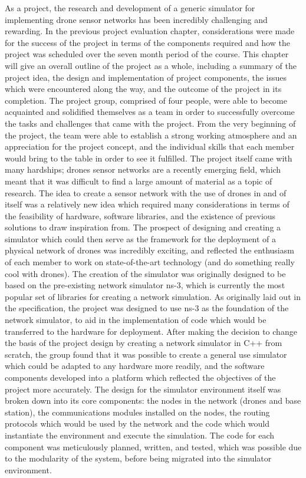 As a project, the research and development of a generic simulator for implementing drone sensor networks has been incredibly challenging and rewarding. In the previous project evaluation chapter, considerations were made for the success of the project in terms of the components required and how the project was scheduled over the seven month period of the course. This chapter will give an overall outline of the project as a whole, including a summary of the project idea, the design and implementation of project components, the issues which were encountered along the way, and the outcome of the project in its completion. 
The project group, comprised of four people, were able to become acquainted and solidified themselves as a team in order to successfully overcome the tasks and challenges that came with the project. From the very beginning of the project, the team were able to establish a strong working atmosphere and an appreciation for the project concept, and the individual skills that each member would bring to the table in order to see it fulfilled. The project itself came with many hardships; drones sensor networks are a recently emerging field, which meant that it was difficult to find a large amount of material as a topic of research. The idea to create a sensor network with the use of drones in and of itself was a relatively new idea which required many considerations in terms of the feasibility of hardware, software libraries, and the existence of previous solutions to draw inspiration from. The prospect of designing and creating a simulator which could then serve as the framework for the deployment of a physical network of drones was incredibly exciting, and reflected the enthusiasm of each member to work on state-of-the-art technology (and do something really cool with drones). 
The creation of the simulator was originally designed to be based on the pre-existing network simulator ns-3, which is currently the most popular set of libraries for creating a network simulation. As originally laid out in the specification, the project was designed to use ns-3 as the foundation of the network simulator, to aid in the implementation of code which would be transferred to the hardware for deployment. After making the decision to change the basis of the project design by creating a network simulator in C++ from scratch, the group found that it was possible to create a general use simulator which could be adapted to any hardware more readily, and the software components developed into a platform which reflected the objectives of the project more accurately. The design for the simulator environment itself was broken down into its core components: the nodes in the network (drones and base station), the communications modules installed on the nodes, the routing protocols which would be used by the network and the code which would instantiate the environment and execute the simulation. The code for each component was meticulously planned, written, and tested, which was possible due to the modularity of the system, before being migrated into the simulator environment. 
